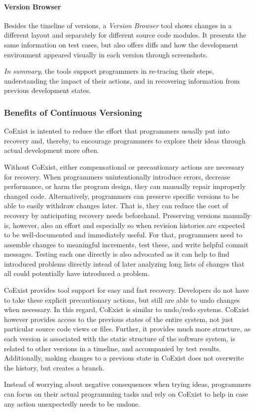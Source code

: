 \paragraph{Version Browser}
Besides the timeline of versions, a \emph{Version Browser} tool shows changes in a different layout and separately for different source code modules.
It presents the same information on test cases, but also offers diffs and how the development environment appeared visually in each version through screenshots.

\emph{In summary}, the tools support programmers in re-tracing their steps, understanding the impact of their actions, and in recovering information from previous development states.


\subsubsection{Benefits of Continuous Versioning}

CoExist is intented to reduce the effort that programmers usually put into recovery and, thereby, to encourage programmers to explore their ideas through actual development more often.

Without CoExist, either compensational or precautionary actions are necessary for recovery.
When programmers unintentionally introduce errors, decrease performance, or harm the program design, they can manually repair improperly changed code.
Alternatively, programmers can preserve specific versions to be able to easily withdraw changes later.
That is, they can reduce the cost of recovery by anticipating recovery needs beforehand.
Preserving versions manually is, however, also an effort and especially so when revision histories are expected to be well-documented and immediately useful.
For that, programmers need to assemble changes to meaningful increments, test these, and write helpful commit messages.
Testing each one directly is also advocated as it can help to find introduced problems directly intead of later analyzing long lists of changes that all could potentially have introduced a problem.

CoExist provides tool support for easy and fast recovery.
Developers do not have to take these explicit precautionary actions, but still are able to undo changes when necessary.
In this regard, CoExist is similar to undo/redo systems.
CoExist however provides access to the previous states of the entire system, not just particular source code views or files.
Further, it provides much more structure, as each version is associated with the static structure of the software system, is related to other versions in a timeline, and accompanied by test results.
Additionally, making changes to a previous state in CoExist does not overwrite the history, but creates a branch.

Instead of worrying about negative consequences when trying ideas, programmers can focus on their actual programming tasks and rely on CoExist to help in case any action unexpectedly needs to be undone.

